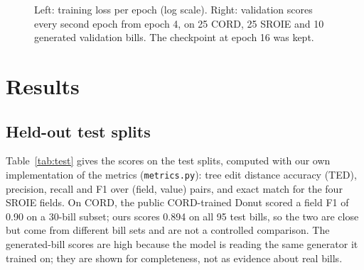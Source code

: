 \documentclass[10pt,a4paper]{article}
\begin{document}
\begin{figure}[!ht]
\centering
{}\hfill
{}
\caption{Left: training loss per epoch (log scale). Right: validation scores every second epoch from epoch 4, on 25 CORD, 25 SROIE and 10 generated validation bills. The checkpoint at epoch 16 was kept.}\label{fig:curves}
\end{figure}

\section{Results}\label{sec:res}
\subsection{Held-out test splits}
Table~\ref{tab:test} gives the scores on the test splits, computed with our own implementation of the metrics (\texttt{metrics.py}): tree edit distance accuracy (TED), precision, recall and F1 over (field, value) pairs, and exact match for the four SROIE fields. On CORD, the public CORD-trained Donut scored a field F1 of 0.90 on a 30-bill subset; ours scores 0.894 on all 95 test bills, so the two are close but come from different bill sets and are not a controlled comparison. The generated-bill scores are high because the model is reading the same generator it trained on; they are shown for completeness, not as evidence about real bills.
\end{document}
